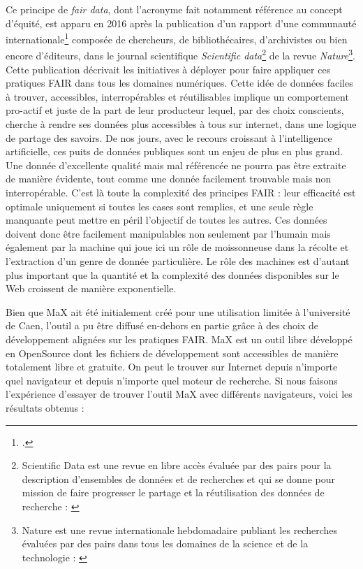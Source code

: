 \documentclass[a4paper,12pt,twoside]{book}
\begin{document}
Ce principe de \textit{fair data}, dont l'acronyme fait notamment référence au concept d'équité, est apparu en 2016 après la publication d'un rapport d'une communauté internationale\footcite{wilkinson_fair_2016} composée de chercheurs, de bibliothécaires, d'archivistes ou bien encore d'éditeurs, dans le journal scientifique \textit{Scientific data}\footnote{Scientific Data est une revue en libre accès évaluée par des pairs pour la description d'ensembles de données et de recherches et qui se donne pour mission de faire progresser le partage et la réutilisation des données de recherche : \cite{scientific-data}} de la revue \textit{Nature}\footnote{Nature est une revue internationale hebdomadaire publiant les recherches évaluées par des pairs dans tous les domaines de la science et de la technologie : \cite{nature}}. Cette publication décrivait les initiatives à déployer pour faire appliquer ces pratiques FAIR dans tous les domaines numériques.
Cette idée de données faciles à trouver, accessibles, interropérables et réutilisables implique un comportement pro-actif et juste de la part de leur producteur lequel, par des choix conscients, cherche à rendre ses données plus accessibles à tous sur internet, dans une logique de partage des savoirs. De nos jours, avec le recours croissant à l'intelligence artificielle, ces puits de données publiques sont un enjeu de plus en plus grand. Une donnée d'excellente qualité mais mal référencée ne pourra pas être extraite de manière évidente, tout comme une donnée facilement trouvable mais non interropérable. C'est là toute la complexité des principes FAIR : leur efficacité est optimale uniquement si toutes les cases sont remplies, et une seule règle manquante peut mettre en péril l'objectif de toutes les autres. Ces données doivent donc être facilement manipulables non seulement par l'humain mais également par la machine qui joue ici un rôle de moissonneuse dans la récolte et l'extraction d'un genre de donnée particulière. Le rôle des machines est d'autant plus important que la quantité et la complexité des données disponibles sur le Web croissent de manière exponentielle.


Bien que MaX ait été initialement créé pour une utilisation limitée à l'université de Caen, l'outil a pu être diffusé en-dehors en partie grâce à des choix de développement alignées sur les pratiques FAIR.
MaX est un outil libre développé en OpenSource dont les fichiers de développement sont accessibles de manière totalement libre et gratuite. On peut le trouver sur Internet depuis n'importe quel navigateur et depuis n'importe quel moteur de recherche.
Si nous faisons l'expérience d'essayer de trouver l'outil MaX avec différents navigateurs, voici les résultats obtenus :
\end{document}
